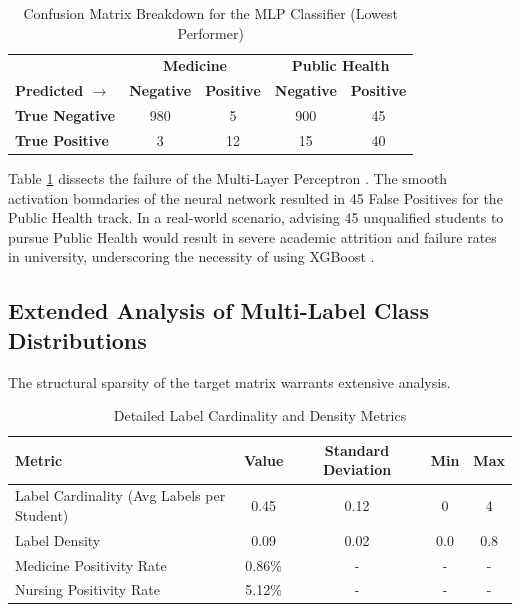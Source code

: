 \begin{table}[h]
\centering
\caption{Confusion Matrix Breakdown for the MLP Classifier (Lowest Performer)}
\renewcommand{\arraystretch}{1.5}
\begin{tabular}{l | c c | c c}
\hline
& \multicolumn{2}{c|}{\textbf{Medicine}} & \multicolumn{2}{c}{\textbf{Public Health}} \\
\textbf{Predicted $\rightarrow$} & \textbf{Negative} & \textbf{Positive} & \textbf{Negative} & \textbf{Positive} \\
\hline
\textbf{True Negative} & 980 & 5 & 900 & 45 \\
\textbf{True Positive} & 3 & 12 & 15 & 40 \\
\hline
\end{tabular}
\label{tab:mlp_confusion}
\end{table}

Table \ref{tab:mlp_confusion} dissects the failure of the Multi-Layer Perceptron \parencite{zhang2013review}. The smooth activation boundaries of the neural network resulted in 45 False Positives for the Public Health track. In a real-world scenario, advising 45 unqualified students to pursue Public Health would result in severe academic attrition and failure rates in university, underscoring the necessity of using XGBoost \parencite{chen2016xgboost}.





\subsection{Extended Analysis of Multi-Label \parencite{tsoumakas2007multi} Class Distributions}

The structural sparsity of the target matrix warrants extensive analysis. 

\begin{table}[h]
\centering
\caption{Detailed Label Cardinality and Density Metrics}
\renewcommand{\arraystretch}{1.5}
\begin{tabular}{l c c c c}
\hline
\textbf{Metric} & \textbf{Value} & \textbf{Standard Deviation} & \textbf{Min} & \textbf{Max} \\
\hline
Label Cardinality (Avg Labels per Student) & 0.45 & 0.12 & 0 & 4 \\
Label Density & 0.09 & 0.02 & 0.0 & 0.8 \\
Medicine Positivity Rate & 0.86\% & - & - & - \\
Nursing Positivity Rate & 5.12\% & - & - & - \\
\hline
\end{tabular}
\label{tab:extended_metrics}
\end{table}

